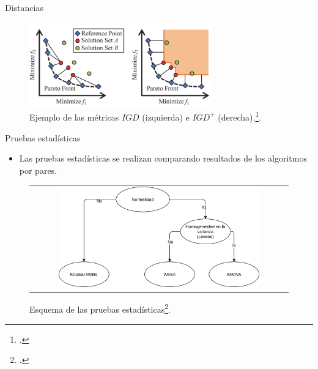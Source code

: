 \documentclass{beamer}
\begin{document}
\begin{frame}{Distancias}

\begin{table}[]
\end{table}
\begin{figure}[H]
\centering
\includegraphics[width=0.7\textwidth]{Images/igd.png}
\caption{\scriptsize Ejemplo de las métricas $IGD$ (izquierda) e $IGD^+$ (derecha).\footcite{ishibuchi2016sensitivity}.}
\end{figure}
\end{frame}





\begin{frame}{Pruebas estadísticas}
\begin{itemize}
\item Las pruebas estadísticas se realizan comparando resultados de los algoritmos por pares.
\end{itemize}
\begin{figure}[H]
\begin{tabular}{c}
\includegraphics[width=0.8\textwidth]{Images/Tests.png}
\end{tabular}
\centering
\caption{\scriptsize Esquema de las pruebas estadísticas\footcite{Joel:StatisticalTest}.}
\end{figure}

\end{frame}
\end{document}
